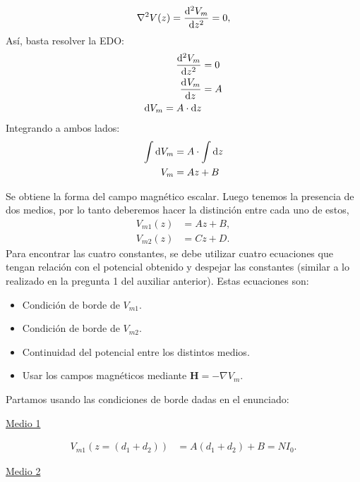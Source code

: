 \documentclass[
  11pt,
  letterpaper,
   answers
  ]{exam}
\begin{document}
\begin{questions}
\begin{solution}
\begin{parts}
  \begin{align}
    \nabla^{2} V(z) = \dod[2]{V_m}{z} &= 0,\\
  \end{align}
  Así, basta resolver la EDO:
  \begin{align}
  \dod[2]{V_m}{z} &= 0\\
  \dod{V_m}{z}&=A \\
  \dif{V_m} = A\cdot \dif{z}
  \end{align}
  Integrando a ambos lados:
  \begin{align}
      \int\dif{V_m} &= A\cdot \int\dif{z}\\
      V_m&=Az+B
  \end{align}
  
  Se obtiene la forma del campo magnético escalar. Luego tenemos la presencia de dos medios, por lo tanto deberemos hacer la distinción entre cada uno de estos,
  \begin{align}
    V_{m1}(z) &= Az + B, \\
    V_{m2}(z) &= Cz + D.
  \end{align}
  \newpage
  Para encontrar las cuatro constantes, se debe utilizar cuatro ecuaciones que tengan relación con el potencial obtenido y despejar las constantes (similar a lo realizado en la pregunta 1 del auxiliar anterior). Estas ecuaciones son:
  \begin{itemize}
      \item Condición de borde de $V_{m1}$.
      \item Condición de borde de $V_{m2}$.
      \item Continuidad del potencial entre los distintos medios.
      \item Usar los campos magnéticos mediante $\mathbf{H}= -\nabla V_m$.
      \end{itemize}
  Partamos usando las condiciones de borde dadas en el enunciado:

  \underline{Medio 1}

  \begin{align}
    V_{m1}(z=(d_{1} + d_{2}))  &= A(d_{1} + d_{2}) + B = N I_{0}.
  \end{align}

  \underline{Medio 2}


\end{parts}
\end{solution}
\end{questions}
\end{document}

